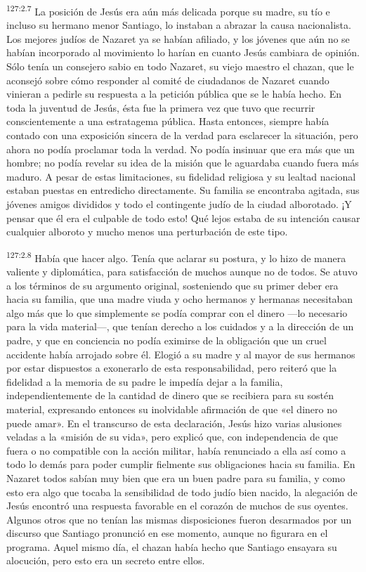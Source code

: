 \par 
\textsuperscript{127:2.7} La posición de Jesús era aún más delicada porque su madre, su tío e incluso su hermano menor Santiago, lo instaban a abrazar la causa nacionalista. Los mejores judíos de Nazaret ya se habían afiliado, y los jóvenes que aún no se habían incorporado al movimiento lo harían en cuanto Jesús cambiara de opinión. Sólo tenía un consejero sabio en todo Nazaret, su viejo maestro el chazan, que le aconsejó sobre cómo responder al comité de ciudadanos de Nazaret cuando vinieran a pedirle su respuesta a la petición pública que se le había hecho. En toda la juventud de Jesús, ésta fue la primera vez que tuvo que recurrir conscientemente a una estratagema pública. Hasta entonces, siempre había contado con una exposición sincera de la verdad para esclarecer la situación, pero ahora no podía proclamar toda la verdad. No podía insinuar que era más que un hombre; no podía revelar su idea de la misión que le aguardaba cuando fuera más maduro. A pesar de estas limitaciones, su fidelidad religiosa y su lealtad nacional estaban puestas en entredicho directamente. Su familia se encontraba agitada, sus jóvenes amigos divididos y todo el contingente judío de la ciudad alborotado. ¡Y pensar que él era el culpable de todo esto! Qué lejos estaba de su intención causar cualquier alboroto y mucho menos una perturbación de este tipo.

\par 
\textsuperscript{127:2.8} Había que hacer algo. Tenía que aclarar su postura, y lo hizo de manera valiente y diplomática, para satisfacción de muchos aunque no de todos. Se atuvo a los términos de su argumento original, sosteniendo que su primer deber era hacia su familia, que una madre viuda y ocho hermanos y hermanas necesitaban algo más que lo que simplemente se podía comprar con el dinero ---lo necesario para la vida material---, que tenían derecho a los cuidados y a la dirección de un padre, y que en conciencia no podía eximirse de la obligación que un cruel accidente había arrojado sobre él. Elogió a su madre y al mayor de sus hermanos por estar dispuestos a exonerarlo de esta responsabilidad, pero reiteró que la fidelidad a la memoria de su padre le impedía dejar a la familia, independientemente de la cantidad de dinero que se recibiera para su sostén material, expresando entonces su inolvidable afirmación de que «el dinero no puede amar». En el transcurso de esta declaración, Jesús hizo varias alusiones veladas a la «misión de su vida», pero explicó que, con independencia de que fuera o no compatible con la acción militar, había renunciado a ella así como a todo lo demás para poder cumplir fielmente sus obligaciones hacia su familia. En Nazaret todos sabían muy bien que era un buen padre para su familia, y como esto era algo que tocaba la sensibilidad de todo judío bien nacido, la alegación de Jesús encontró una respuesta favorable en el corazón de muchos de sus oyentes. Algunos otros que no tenían las mismas disposiciones fueron desarmados por un discurso que Santiago pronunció en ese momento, aunque no figurara en el programa. Aquel mismo día, el chazan había hecho que Santiago ensayara su alocución, pero esto era un secreto entre ellos.

